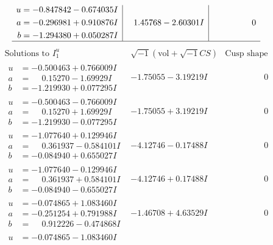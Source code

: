 \documentclass[1p]{elsarticle_modified}
\theoremstyle{definition}
\newcommand{\I}{\sqrt{-1}}
\begin{document}
$$\begin{array}{c|c|c}
\begin{aligned}
u &= -0.847842 - 0.674035 I \\
a &= -0.296981 + 0.910876 I \\
b &= -1.294380 + 0.050287 I\end{aligned}
 & \phantom{-}1.45768 - 2.60301 I & \phantom{-0.000000 } 0\\
 \hline 
 \end{array}$$\newpage$$\begin{array}{c|c|c}  
\text{Solutions to }I^u_{1}& \I (\text{vol} + \sqrt{-1}CS) & \text{Cusp shape}\\
 \hline 
\begin{aligned}
u &= -0.500463 + 0.766009 I \\
a &= \phantom{-}0.15270 - 1.69929 I \\
b &= -1.219930 + 0.077295 I\end{aligned}
 & -1.75055 - 3.19219 I & \phantom{-0.000000 } 0 \\ \hline\begin{aligned}
u &= -0.500463 - 0.766009 I \\
a &= \phantom{-}0.15270 + 1.69929 I \\
b &= -1.219930 - 0.077295 I\end{aligned}
 & -1.75055 + 3.19219 I & \phantom{-0.000000 } 0 \\ \hline\begin{aligned}
u &= -1.077640 + 0.129946 I \\
a &= \phantom{-}0.361937 - 0.584101 I \\
b &= -0.084940 + 0.655027 I\end{aligned}
 & -4.12746 - 0.17488 I & \phantom{-0.000000 } 0 \\ \hline\begin{aligned}
u &= -1.077640 - 0.129946 I \\
a &= \phantom{-}0.361937 + 0.584101 I \\
b &= -0.084940 - 0.655027 I\end{aligned}
 & -4.12746 + 0.17488 I & \phantom{-0.000000 } 0 \\ \hline\begin{aligned}
u &= -0.074865 + 1.083460 I \\
a &= -0.251254 + 0.791988 I \\
b &= \phantom{-}0.912226 - 0.474868 I\end{aligned}
 & -1.46708 + 4.63529 I & \phantom{-0.000000 } 0 \\ \hline\begin{aligned}
u &= -0.074865 - 1.083460 I \\

\end{aligned}
\end{array}$$
\end{document}
